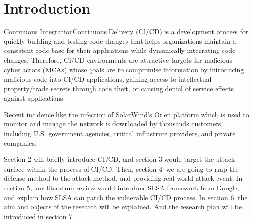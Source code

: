 \section{Introduction}
Continuous Integration\/Continuous Delivery (CI/CD) is a development
process for quickly building and testing code changes that helps 
organizations maintain a consistent code base for their applications 
while dynamically integrating code changes. Therefore, CI/CD environments 
are attractive targets for malicious cyber actors (MCAs) whose goals are 
to compromise information by introducing malicious code into CI/CD 
applications, gaining access to intellectual property/trade secrets 
through code theft, or causing denial of service effects against applications.

Recent incidence like the infection of SolarWind's Orien platform \cite{ladisa2023sok, peisert2021perspectives} 
which is used to monitor and manage the network is downloaded by thousands customers, 
including U.S. government agencies, critical infrastrure providers, and private companies. 
 
Section 2 will briefly introduce CI/CD, and section 3 would target the attack
surface within the process of CI/CD. Then, section 4, we are going to map the 
defense method to the attack method, and providing real world attack event.
In section 5, our literature review would introduce SLSA framework from Google,
and explain how SLSA can patch the vulnerable CI/CD process. In section 6, the
aim and objects of the research will be explained. And the research plan will be 
introduced in section 7. 



